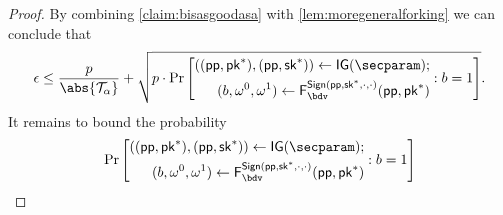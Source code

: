 \begin{proof}
  By combining \autoref{claim:bisasgoodasa} with \autoref{lem:moregeneralforking} we can conclude that
  \begin{equation}
    \epsilon \leq \frac{p}{\abs{\tern_\alpha}} + \sqrt{p\cdot\Pr\left[\begin{aligned}((\params,\pk^*),(\params,\sk^*)) \gets \IG(\secparam);\\ (b,\omega^0,\omega^1)\gets \fork^{\sign(\params,\sk^*,\cdot,\cdot)}_\bdv(\params,\pk^*)\end{aligned} : b=1 \right]}.\label{eq:forkingresult}
  \end{equation}
  It remains to bound the probability
  \[
    \Pr\left[\begin{aligned}((\params,\pk^*),(\params,\sk^*)) \gets \IG(\secparam);\\ (b,\omega^0,\omega^1)\gets \fork^{\sign(\params,\sk^*,\cdot,\cdot)}_\bdv(\params,\pk^*)\end{aligned} : b=1 \right]
  \]
  

\end{proof}
